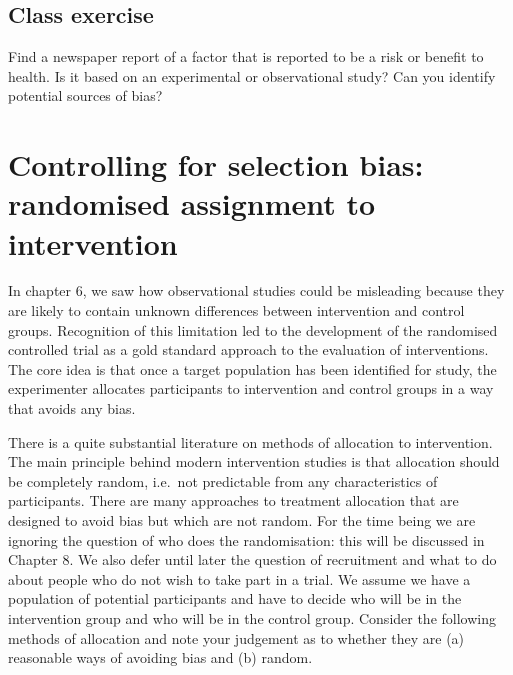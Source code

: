 \documentclass[]{book}
\begin{document}
\hypertarget{class-exercise-2}{%
\section{Class exercise}\label{class-exercise-2}}

Find a newspaper report of a factor that is reported to be a risk or benefit to health. Is it based on an experimental or observational study? Can you identify potential sources of bias?

\hypertarget{controlling-for-selection-bias-randomised-assignment-to-intervention}{%
\chapter{Controlling for selection bias: randomised assignment to intervention}\label{controlling-for-selection-bias-randomised-assignment-to-intervention}}

In chapter 6, we saw how observational studies could be misleading because they are likely to contain unknown differences between intervention and control groups. Recognition of this limitation led to the development of the randomised controlled trial as a gold standard approach to the evaluation of interventions. The core idea is that once a target population has been identified for study, the experimenter allocates participants to intervention and control groups in a way that avoids any bias.

There is a quite substantial literature on methods of allocation to intervention. The main principle behind modern intervention studies is that allocation should be completely random, i.e.~not predictable from any characteristics of participants. There are many approaches to treatment allocation that are designed to avoid bias but which are not random. For the time being we are ignoring the question of who does the randomisation: this will be discussed in Chapter 8. We also defer until later the question of recruitment and what to do about people who do not wish to take part in a trial. We assume we have a population of potential participants and have to decide who will be in the intervention group and who will be in the control group. Consider the following methods of allocation and note your judgement as to whether they are (a) reasonable ways of avoiding bias and (b) random.
\end{document}
